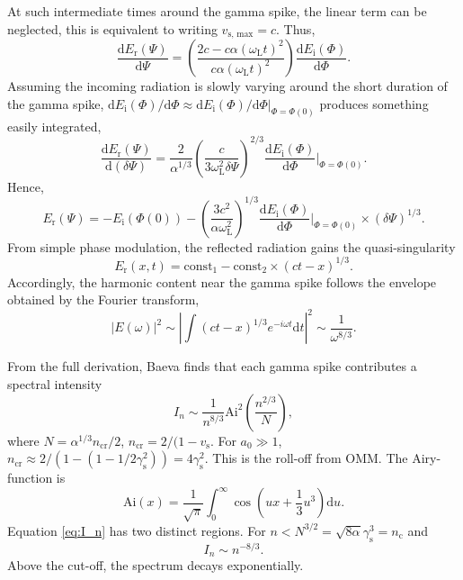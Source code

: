 At such intermediate times around the gamma spike, the linear term can be neglected, this is equivalent to writing $v_\mathrm{s,\, max} = c$. Thus,
\begin{equation}
	\frac{\mathrm{d}E_\mathrm{r}(\Psi)}{\mathrm{d}\Psi} = \left(\frac{2c - c\alpha (\omega_\mathrm{L}t)^2}{c\alpha (\omega_\mathrm{L}t)^2}\right)\frac{\mathrm{d}E_\mathrm{i}(\Phi)}{\mathrm{d}\Phi}.
\end{equation}
Assuming the incoming radiation is slowly varying around the short duration of the gamma spike, $\mathrm{d}E_\mathrm{i}(\Phi)/\mathrm{d}\Phi \approx \mathrm{d}E_\mathrm{i}(\Phi)/\mathrm{d}\Phi|_{\Phi = \Phi(0)}$ produces something easily integrated,
\begin{equation}
	\frac{\mathrm{d}E_\mathrm{r}(\Psi)}{\mathrm{d}(\delta \Psi)} = \frac{2}{\alpha^{1/3}} \left(\frac{c}{3\omega_\mathrm{L}^2 \delta \Psi}\right)^{2/3}\frac{\mathrm{d}E_\mathrm{i}(\Phi)}{\mathrm{d}\Phi}|_{\Phi = \Phi(0)}.
\end{equation}
Hence,
\begin{equation}
	E_\mathrm{r}(\Psi) = -E_\mathrm{i}(\Phi(0)) - \left(\frac{3c^2}{\alpha \omega_\mathrm{L}^2}\right)^{1/3}\frac{\mathrm{d}E_\mathrm{i}(\Phi)}{\mathrm{d}\Phi}|_{\Phi = \Phi(0)} \times (\delta \Psi)^{1/3}.
\end{equation}
From simple phase modulation, the reflected radiation gains the quasi-singularity
\begin{equation}
	E_\mathrm{r}(x,t) = \mathrm{const}_1 - \mathrm{const_2}\times (ct - x)^{1/3}.
\end{equation}
Accordingly, the harmonic content near the gamma spike follows the envelope obtained by the Fourier transform,
\begin{equation}
	|E(\omega)|^2 \sim \left|\int (ct-x)^{1/3}e^{-i\omega t} \mathrm{d} t\right|^2 \sim \frac{1}{\omega^{8/3}}.
\end{equation}

From the full derivation, Baeva finds that each gamma spike contributes a spectral intensity
\begin{equation}\label{eq:I_n}
	I_n \sim \frac{1}{n^{8/3}} \mathrm{Ai}^2\left(\frac{n^{2/3}}{N}\right),
\end{equation}
where $N = \alpha^{1/3}n_\mathrm{cr}/2$, $n_\mathrm{cr} = 2/(1-v_\mathrm{s}$. For $a_0 \gg 1$, $n_\mathrm{cr} \approx 2/(1-(1-1/2\gamma_\mathrm{s}^2)) = 4 \gamma_\mathrm{s}^2$. This is the roll-off from \ac{OMM}. The Airy-function is
\begin{equation}
	\mathrm{Ai}(x) = \frac{1}{\sqrt{\pi}}\int_0^\infty \cos\left(ux + \frac{1}{3} u^3\right) \mathrm{d}u.
\end{equation}
Equation \ref{eq:I_n} has two distinct regions. For $n<N^{3/2} = \sqrt{8\alpha}\gamma_\mathrm{s}^3 = n_\mathrm{c}$ and
\begin{equation}
	I_n \sim n^{-8/3}.
\end{equation}
Above the cut-off, the spectrum decays exponentially.


